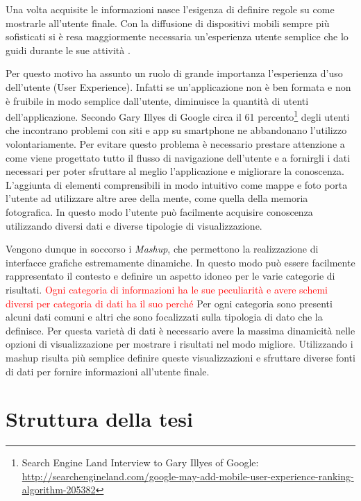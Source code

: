 
Una volta acquisite le informazioni nasce l'esigenza di definire regole su come mostrarle all'utente finale. Con la diffusione di dispositivi mobili sempre più sofisticati si è resa maggiormente necessaria un'esperienza utente semplice che lo guidi durante le sue attività .


Per questo motivo ha assunto un ruolo di grande importanza l'esperienza d'uso dell'utente (User Experience). Infatti se un'applicazione non è ben formata e non è fruibile in modo semplice dall'utente, diminuisce la quantità di utenti dell'applicazione. Secondo Gary Illyes di Google circa il 61 percento\footnote{Search Engine Land Interview to Gary Illyes of Google: \url{http://searchengineland.com/google-may-add-mobile-user-experience-ranking-algorithm-205382}} degli utenti che incontrano problemi con siti e app su smartphone ne abbandonano l'utilizzo volontariamente. Per evitare questo problema è necessario prestare attenzione a come viene progettato tutto il flusso di navigazione dell'utente e a fornirgli i dati necessari per poter sfruttare al meglio l'applicazione e migliorare la conoscenza. L'aggiunta di elementi comprensibili in modo intuitivo come mappe e foto porta l'utente ad utilizzare altre aree della mente, come quella della memoria fotografica. In questo modo l'utente può facilmente acquisire conoscenza utilizzando diversi dati e diverse tipologie di visualizzazione.


Vengono dunque in soccorso i \emph{Mashup}, che permettono la realizzazione di interfacce grafiche estremamente dinamiche. In questo modo può essere facilmente rappresentato il contesto e definire un aspetto idoneo per le varie categorie di risultati. \textcolor{red}{Ogni categoria di informazioni ha le sue peculiarità e avere schemi diversi per categoria di dati ha il suo perché}
Per ogni categoria sono presenti alcuni dati comuni e altri che sono focalizzati sulla tipologia di dato che la definisce. Per questa varietà di dati è necessario avere la massima dinamicità nelle opzioni di visualizzazione per mostrare i risultati nel modo migliore. Utilizzando i mashup risulta più semplice definire queste visualizzazioni e sfruttare diverse fonti di dati per fornire informazioni all'utente finale.

\section{Struttura della tesi\label{sec:struttura-tesi}}

